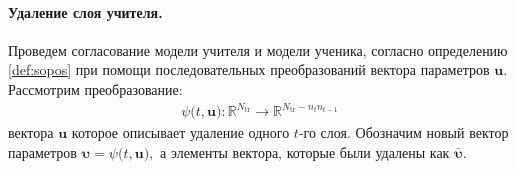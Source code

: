 \paragraph{Удаление слоя учителя.}
Проведем согласование модели учителя и модели ученика, согласно определению \ref{def:sopos} при помощи последовательных преобразований вектора параметров $\mathbf{u}$. Рассмотрим преобразование:
\[
\label{eq:ap:4}
\begin{aligned}
\psi\bigr(t, \mathbf{u}\bigr) : \mathbb{R}^{N_{\text{tr}}} \to \mathbb{R}^{N_{\text{tr}}-n_tn_{t-1}}
\end{aligned}
\]
вектора $\mathbf{u}$ которое описывает удаление одного $t$-го слоя.
Обозначим новый вектор параметров $\bm{\upsilon} = \psi\bigr(t, \mathbf{u}\bigr),$ а элементы вектора, которые были удалены как $\bar{\bm{\upsilon}}.$ 

